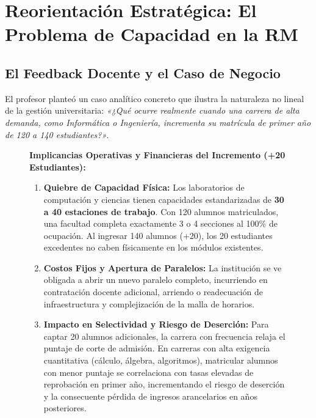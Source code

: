 \documentclass[11pt,a4paper]{article}
\begin{document}
\section{Reorientación Estratégica: El Problema de Capacidad en la RM}
\label{sec:reorientacion}

\subsection{El Feedback Docente y el Caso de Negocio}
El profesor planteó un caso analítico concreto que ilustra la naturaleza no lineal de la gestión universitaria: \emph{«¿Qué ocurre realmente cuando una carrera de alta demanda, como Informática o Ingeniería, incrementa su matrícula de primer año de 120 a 140 estudiantes?»}.

\begin{figure}[h!]
\centering
\begin{tcolorbox}[colback=lightbg, colframe=secondaryblue, width=0.95\textwidth]
\small
\textbf{Implicancias Operativas y Financieras del Incremento (+20 Estudiantes):}
\begin{enumerate}[leftmargin=*]
    \item \textbf{Quiebre de Capacidad Física:} Los laboratorios de computación y ciencias tienen capacidades estandarizadas de \textbf{30 a 40 estaciones de trabajo}. Con 120 alumnos matriculados, una facultad completa exactamente 3 o 4 secciones al 100\% de ocupación. Al ingresar 140 alumnos (+20), los 20 estudiantes excedentes no caben físicamente en los módulos existentes.
    \item \textbf{Costos Fijos y Apertura de Paralelos:} La institución se ve obligada a abrir un nuevo paralelo completo, incurriendo en contratación docente adicional, arriendo o readecuación de infraestructura y complejización de la malla de horarios.
    \item \textbf{Impacto en Selectividad y Riesgo de Deserción:} Para captar 20 alumnos adicionales, la carrera con frecuencia relaja el puntaje de corte de admisión. En carreras con alta exigencia cuantitativa (cálculo, álgebra, algoritmos), matricular alumnos con menor puntaje se correlaciona con tasas elevadas de reprobación en primer año, incrementando el riesgo de deserción y la consecuente pérdida de ingresos arancelarios en años posteriores.
\end{enumerate}
\end{tcolorbox}
\end{figure}
\end{document}
